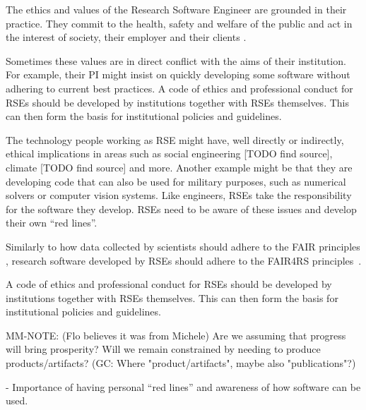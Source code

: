 \documentclass{eceasst}
\begin{document}
The ethics and values of the Research Software Engineer are grounded in their practice.
They commit to the health, safety and welfare of the public and act in the interest of society, their employer and their clients \cite{Goth2024}.

Sometimes these values are in direct conflict with the aims of their institution. For example, their PI might insist on quickly developing some software without adhering to current best practices.
A code of ethics and professional conduct for RSEs should be developed by institutions together with RSEs themselves. This can then form the basis for institutional policies and guidelines.

The technology people working as RSE might have, well directly or indirectly, ethical implications in areas such as social engineering [TODO find source], climate [TODO find source] and more.
Another example might be that they are developing code that can also be used for military purposes, such as numerical solvers or computer vision systems.
Like engineers, RSEs take the responsibility for the software they develop.
RSEs need to be aware of these issues and develop their own ``red lines''.

Similarly to how data collected by scientists should adhere to the FAIR principles \cite{FAIR}, research software developed by RSEs should adhere to the FAIR4RS principles~\cite{FAIR4RS}.

A code of ethics and professional conduct for RSEs should be developed by institutions together with RSEs themselves.
This can then form the basis for institutional policies and guidelines.

MM-NOTE: (Flo believes it was from Michele) Are we assuming that progress will bring prosperity? Will we remain constrained by needing to produce products/artifacts? (GC: Where "product/artifacts", maybe also "publications"?)

  - Importance of having personal “red lines” and awareness of how software can be used.
\end{document}
